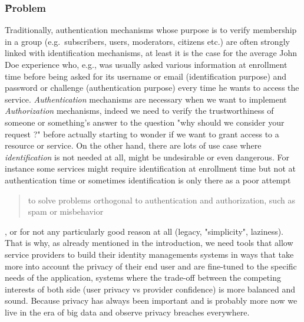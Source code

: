     \subsubsection{\~Problem}
    Traditionally, authentication mechanisms whose purpose is to verify membership in a group
    (e.g.\ subscribers, users, moderators, citizens etc.)
    are often strongly linked with identification mechanisms, at least it is the case for the average John Doe experience
    who, e.g., was usually asked various information at enrollment time before being asked for its username or email
    (identification purpose) and password or challenge (authentication purpose) every time he wants to access the service.
    \emph{Authentication} mechanisms are necessary when we want to implement \emph{Authorization} mechanisms, indeed we
    need to verify the trustworthiness of someone or something's answer to the question "why should we consider your request ?"
    before actually starting to wonder if we want to grant access to a resource or service.
    On the other hand, there are lots of use case where \emph{identification} is not needed at all, might be undesirable or even dangerous.
    For instance some services might require identification at enrollment time but not at authentication time or sometimes identification is only there as a poor attempt \blockquote{
        to solve problems orthogonal to authentication and authorization, such as spam or misbehavior
    }\cite{syta_identity_2015}, or for not any particularly good reason at all (legacy, "simplicity", laziness).
    That is why, as already mentioned in the introduction, we need tools that allow service providers to build their identity managements
    systems in ways that take more into account the privacy of their end user and are fine-tuned to the specific needs of the application,
    systems where the trade-off between the competing interests of both side (user privacy vs provider confidence) is more balanced and sound.
    Because privacy has always been important and is probably more now we live in the era of big data and observe privacy breaches everywhere.


